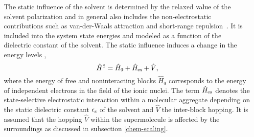 \documentclass[12pt,twoside,a4paper]{report}
\begin{document}
The static 
influence of the solvent 
is determined by the relaxed value of the solvent polarization and in general 
also includes the non-electrostatic contributions such as 
van-der-Waals attraction and  short-range repulsion~\cite{Georgievski,chri99}.  
It is included into the system state energies and
modeled as a function of the dielectric constant of the solvent.
The static influence induces a change in the energy levels \cite{a15},
\begin{equation}
  \label{2}
 \hat H^{\rm S}   
                  =      \hat H_0
                      +  \hat H_{\rm es}
                      +  \hat V,
\end{equation}
where the energy of free and noninteracting blocks $\hat H_0$
corresponds to the energy of independent electrons in the field of the
ionic nuclei. The term $\hat H_{\rm es}$ denotes the state-selective
electrostatic interaction within a molecular aggregate
depending on the static dielectric constant $\epsilon_{\rm s}$ of the solvent 
and $\hat V$ the inter-block
hopping.
It is assumed
that the hopping $\hat V$ within the supermolecule is affected by
the surroundings as discussed in subsection \ref{chem-scaling}.
\end{document}
